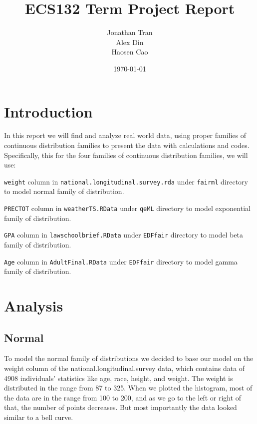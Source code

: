 \documentclass[12pt, a4paper, oneside]{report}
\title{ECS132 Term Project Report}
\author{Jonathan Tran\\Alex Din\\Haosen Cao}
\date{\today}
\begin{document}
\maketitle
\tableofcontents
\newpage







\chapter*{Introduction}
In this report we will find and analyze real world data, using proper families of continuous distribution families to present the data with calculations and codes. 
Specifically, this for the four families of continuous distribution families, we will use:

\lstinline{weight} column in \lstinline{national.longitudinal.survey.rda} under \lstinline{fairml} directory to model normal family of distribution.

\lstinline{PRECTOT} column in \lstinline{weatherTS.RData} under \lstinline{qeML} directory to model exponential family of distribution.

\lstinline{GPA} column in \lstinline{lawschoolbrief.RData} under \lstinline{EDFfair} directory to model beta family of distribution.

\lstinline{Age} column in \lstinline{AdultFinal.RData} under \lstinline{EDFfair} directory to model gamma family of distribution.

\newpage





\chapter*{Analysis}
\newpage





\newpage
\section*{Normal}
To model the normal family of distributions we decided to base our model on the weight column of the national.longitudinal.survey data, which contains data of 4908 individuals' statistics like age, race, height, and weight. The weight is distributed in the range from 87 to 325. When we plotted the histogram, most of the data are in the range from 100 to 200, and as we go to the left or right of that, the number of points decreases. But most importantly the data looked similar to a bell curve.
\end{document}
